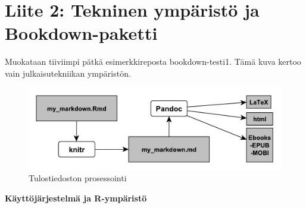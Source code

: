 \documentclass[
  finnish,
]{book}
\begin{document}
\hypertarget{liite-2-tekninen-ympuxe4ristuxf6-ja-bookdown-paketti}{%
\chapter*{Liite 2: Tekninen ympäristö ja Bookdown-paketti}\label{liite-2-tekninen-ympuxe4ristuxf6-ja-bookdown-paketti}}

Muokataan tiiviimpi pätkä esimerkkireposta bookdown-testi1. Tämä kuva kertoo vain
julkaisutekniikan ympäristön.

\begin{figure}

{\centering \includegraphics[width=0.7\linewidth]{img/BookdownProc} 

}

\caption{Tulostiedoston prosessointi}\label{fig:L3bdprocess1}
\end{figure}

\textbf{Käyttöjärjestelmä ja R-ympäristö}
\end{document}
